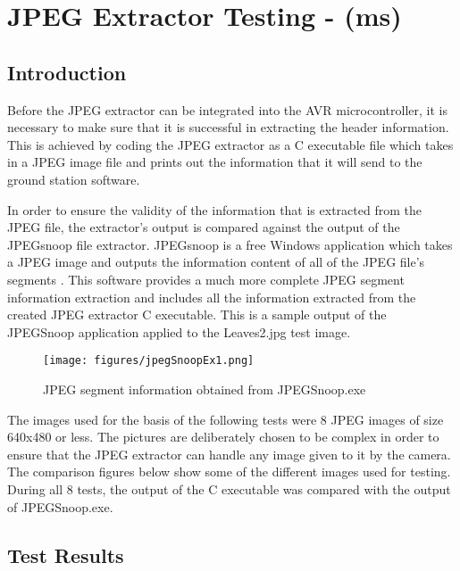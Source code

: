 \section{JPEG Extractor Testing - (ms)}
\label{sec:jpg_prog_test}

\subsection{Introduction}

Before the JPEG extractor can be integrated into the
AVR microcontroller, it is necessary to make sure that it is
successful in extracting the header information. This is 
achieved by coding the JPEG extractor as a C executable
file which takes in a JPEG image file and prints out the
information that it will send to the ground station software.

In order to ensure the validity of the information that is 
extracted from the JPEG file, the extractor's output is 
compared against the output of the JPEGsnoop file extractor. 
JPEGsnoop is a free Windows application which takes a 
JPEG image and outputs the information content of all 
of the JPEG file's segments \cite{hass_impulse_jpeg} .
This software provides a much more 
complete JPEG segment  information extraction and 
includes all the information extracted from the 
created JPEG extractor C executable. This is a sample
output of the JPEGSnoop application applied to the
Leaves2.jpg test image.

\begin{figure}[!hbtp]
\begin{center}
\texttt{[image: figures/jpegSnoopEx1.png]} 
\end{center}
\caption{JPEG segment information obtained from JPEGSnoop.exe}
\end{figure}

\newpage

The images used for the basis of the following tests
were 8 JPEG images of size 640x480 or
less. The pictures are deliberately chosen to be 
complex in order to ensure that the JPEG extractor 
can handle any image given to it by the camera.
The comparison figures below show some of the 
different images used for testing. During all 8 tests,
the output of the C executable was compared with
the output of JPEGSnoop.exe.

\subsection{Test Results}

